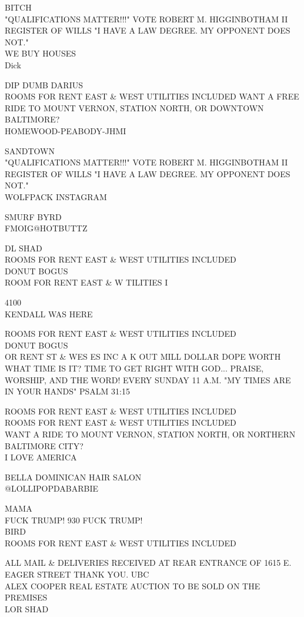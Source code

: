 \documentclass[10pt,letterpaper]{article}
\begin{document}
BITCH\\
"QUALIFICATIONS MATTER!!!" VOTE ROBERT M. HIGGINBOTHAM II REGISTER OF WILLS "I HAVE A LAW DEGREE.  MY OPPONENT DOES NOT."\\
WE BUY HOUSES\\
Dick

DIP DUMB DARIUS\\
ROOMS FOR RENT EAST \& WEST UTILITIES INCLUDED WANT A FREE RIDE TO MOUNT VERNON, STATION NORTH, OR DOWNTOWN BALTIMORE?\\
HOMEWOOD{-}PEABODY{-}JHMI

SANDTOWN\\
"QUALIFICATIONS MATTER!!!" VOTE ROBERT M. HIGGINBOTHAM II REGISTER OF WILLS "I HAVE A LAW DEGREE.  MY OPPONENT DOES NOT."\\
WOLFPACK INSTAGRAM

SMURF BYRD\\
FMOIG@HOTBUTTZ

DL SHAD\\
ROOMS FOR RENT EAST \& WEST UTILITIES INCLUDED\\
DONUT BOGUS\\
ROOM FOR RENT EAST \& W TILITIES I

4100\\
KENDALL WAS HERE

ROOMS FOR RENT EAST \& WEST UTILITIES INCLUDED\\
DONUT BOGUS\\
OR RENT ST \& WES ES INC A K OUT MILL DOLLAR DOPE WORTH\\
WHAT TIME IS IT?  TIME TO GET RIGHT WITH GOD... PRAISE, WORSHIP, AND THE WORD!  EVERY SUNDAY 11 A.M.  "MY TIMES ARE IN YOUR HANDS" PSALM 31:15

ROOMS FOR RENT EAST \& WEST UTILITIES INCLUDED\\
ROOMS FOR RENT EAST \& WEST UTILITIES INCLUDED\\
WANT A RIDE TO MOUNT VERNON, STATION NORTH, OR NORTHERN BALTIMORE CITY?\\
I LOVE AMERICA

BELLA DOMINICAN HAIR SALON\\
@LOLLIPOPDABARBIE

MAMA\\
FUCK TRUMP!  930 FUCK TRUMP!\\
BIRD\\
ROOMS FOR RENT EAST \& WEST UTILITIES INCLUDED

ALL MAIL \& DELIVERIES RECEIVED AT REAR ENTRANCE OF 1615 E. EAGER STREET THANK YOU. UBC\\
ALEX COOPER REAL ESTATE AUCTION TO BE SOLD ON THE PREMISES\\
LOR SHAD
\end{document}
